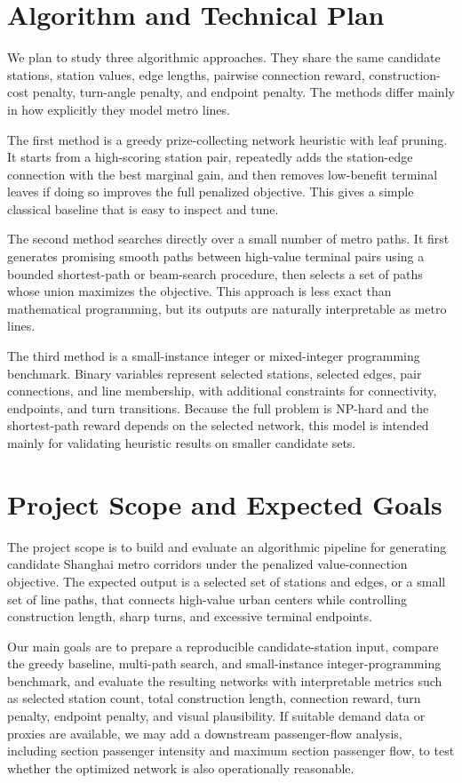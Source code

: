 \documentclass[9pt,a4paper,twocolumn,twoside]{tau-class/tau}
\begin{document}
\section{Algorithm and Technical Plan}

    We plan to study three algorithmic approaches. They share the same candidate stations, station values, edge lengths, pairwise connection reward, construction-cost penalty, turn-angle penalty, and endpoint penalty. The methods differ mainly in how explicitly they model metro lines.

    The first method is a greedy prize-collecting network heuristic with leaf pruning. It starts from a high-scoring station pair, repeatedly adds the station-edge connection with the best marginal gain, and then removes low-benefit terminal leaves if doing so improves the full penalized objective. This gives a simple classical baseline that is easy to inspect and tune.

    The second method searches directly over a small number of metro paths. It first generates promising smooth paths between high-value terminal pairs using a bounded shortest-path or beam-search procedure, then selects a set of paths whose union maximizes the objective. This approach is less exact than mathematical programming, but its outputs are naturally interpretable as metro lines.

    The third method is a small-instance integer or mixed-integer programming benchmark. Binary variables represent selected stations, selected edges, pair connections, and line membership, with additional constraints for connectivity, endpoints, and turn transitions. Because the full problem is NP-hard and the shortest-path reward depends on the selected network, this model is intended mainly for validating heuristic results on smaller candidate sets.

\section{Project Scope and Expected Goals}

    The project scope is to build and evaluate an algorithmic pipeline for generating candidate Shanghai metro corridors under the penalized value-connection objective. The expected output is a selected set of stations and edges, or a small set of line paths, that connects high-value urban centers while controlling construction length, sharp turns, and excessive terminal endpoints.

    Our main goals are to prepare a reproducible candidate-station input, compare the greedy baseline, multi-path search, and small-instance integer-programming benchmark, and evaluate the resulting networks with interpretable metrics such as selected station count, total construction length, connection reward, turn penalty, endpoint penalty, and visual plausibility. If suitable demand data or proxies are available, we may add a downstream passenger-flow analysis, including section passenger intensity and maximum section passenger flow, to test whether the optimized network is also operationally reasonable.
    
\end{document}
